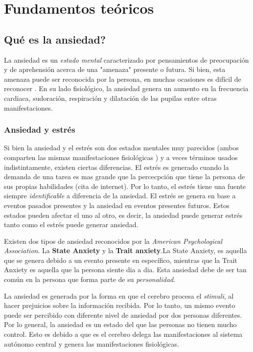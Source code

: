 \documentclass[letterpaper,12pt]{cicese}
\begin{document}
	\chapter{Fundamentos te\'oricos}
	\section{Qu\'e es la ansiedad?}
	
		La ansiedad es un \textit{estado mental} caracterizado por pensamientos de preocupaci\'on y de aprehensi\'on acerca de una "amenaza" presente o futura. Si bien, esta amenaza puede ser reconocida por la persona, en muchas ocasiones es dif\'icil de reconocer \citep{Bystritsky2014489}. En su lado fisiol\'ogico, la ansiedad genera un aumento en la frecuencia cardiaca, sudoraci\'on, respiraci\'on y dilataci\'on de las pupilas entre otras manifestaciones. 

		\subsection{Ansiedad y estr\'es}	

		Si bien la ansiedad y el estr\'es son dos estados mentales muy parecidos (ambos comparten las mismas manifestaciones fisiol\'ogicas ) y a veces t\'erminos usados indistintamente, existen ciertas diferencias. El estr\'es es generado cuando la demanda de una tarea es mas grande que la percecpci\'on que tiene la persona de sus propias habilidades (cita de internet). Por lo tanto, el estr\'es tiene una fuente siempre \textit{identificable} a diferencia de la ansiedad. El estr\'es se genera en base a eventos pasados presentes y la ansiedad en eventos presentes futuros. Estos estados pueden afectar el uno al otro, es decir, la ansiedad puede generar estr\'es tanto como el estr\'es puede generar ansiedad.

			Existen dos tipos de ansiedad reconocidos por la \textit{American Psychological Association}. La \textbf{State Anxiety} y la \textbf{Trait anxiety}.La State Anxiety, es aquella que se genera debido a un evento presente en espec\'ifico, mientras que la Trait Anxiety es aquella que la persona siente dia a dia. Esta ansiedad debe de ser tan com\'un en la persona que forma parte de su \textit{personalidad}.

		La ansiedad es generada por la forma en que el cerebro procesa el \textit{stimuli}, al hacer prejuicios sobre la informaci\'on recibida. Por lo tanto, un mismo evento puede ser percibido con diferente nivel de ansiedad por dos personas diferentes. Por lo general, la ansiedad es un estado del que las personas no tienen mucho control. Esto es debido a que es el cerebro delega las manifestaciones al sistema aut\'onomo central y genera las manifestaciones fisiol\'ogicas.
\end{document}
